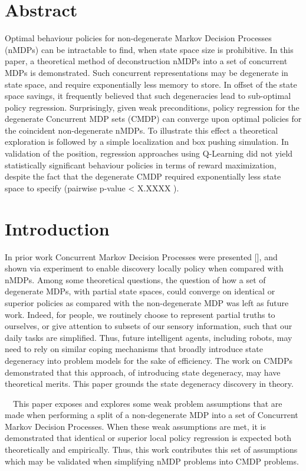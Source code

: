 \documentclass{article}
\title{}
\begin{document}
\clearpage\setcounter{page}{1}\section{Abstract}
Optimal behaviour policies for non-degenerate Markov Decision Processes (nMDPs) can be intractable to find, when state space size is prohibitive. In this paper, a theoretical method of deconstruction nMDPs into a set of concurrent MDPs is demonstrated. Such concurrent representations may be degenerate in state space, and require exponentially less memory to store. In offset of the state space savings, it frequently believed that such degeneracies lead to sub-optimal policy regression. Surprisingly, given weak preconditions, policy regression for the degenerate Concurrent MDP sets (CMDP) can converge upon optimal policies for the coincident non-degenerate nMDPs. To illustrate this effect a theoretical exploration is followed by a simple localization and box pushing simulation. In validation of the position, regression approaches using Q-Learning did not yield statistically significant behaviour policies in terms of reward maximization, despite the fact that the degenerate CMDP required exponentially less state space to specify (pairwise p-value {\textless} X.XXXX ). 

\section{Introduction}
In prior work Concurrent Markov Decision Processes were presented [], and shown via experiment to enable discovery locally policy when compared with nMDPs. Among some theoretical questions, the question of how a set of degenerate MDPs, with partial state spaces, could converge on identical or superior policies as compared with the non-degenerate MDP was left as future work. Indeed, for people, we routinely choose to represent partial truths to ourselves, or give attention to subsets of our sensory information, such that our daily tasks are simplified. Thus, future intelligent agents, including robots, may need to rely on similar coping mechanisms that broadly introduce state degeneracy into problem models for the sake of efficiency. The work on CMDPs demonstrated that this approach, of introducing state degeneracy, may have theoretical merits. This paper grounds the state degeneracy discovery in theory.

\ \ This paper exposes and explores some weak problem assumptions that are made when performing a split of a non-degenerate MDP into a set of Concurrent Markov Decision Processes. When these weak assumptions are met, it is demonstrated that identical or superior local policy regression is expected both theoretically and empirically. Thus, this work contributes this set of assumptions which may be validated when simplifying nMDP problems into CMDP problems.
\end{document}
